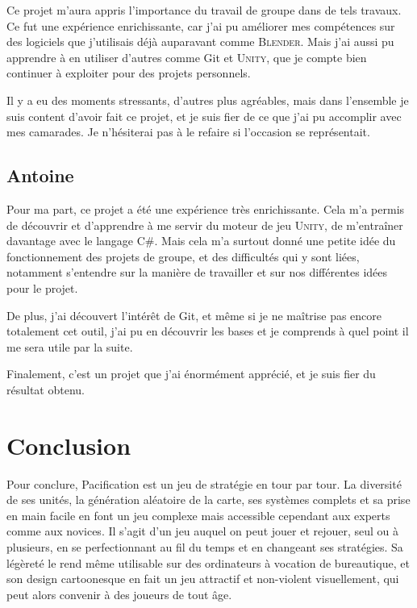 \documentclass[12pt]{report}
\begin{document}
Ce projet m’aura appris l’importance du travail de groupe dans de tels travaux.
Ce fut une expérience enrichissante, car j’ai pu améliorer mes compétences sur
des logiciels que j’utilisais déjà auparavant comme \textsc{Blender}. Mais j’ai
aussi pu apprendre à en utiliser d’autres comme Git et \textsc{Unity}, que je
compte bien continuer à exploiter pour des projets personnels.

Il y a eu des moments stressants, d’autres plus agréables, mais dans l’ensemble
je suis content d’avoir fait ce projet, et je suis fier de ce que j’ai pu
accomplir avec mes camarades. Je n’hésiterai pas à le refaire si l’occasion se
représentait. 

\section{Antoine}

Pour ma part, ce projet a été une expérience très enrichissante. Cela m’a permis
de découvrir et d’apprendre à me servir du moteur de jeu \textsc{Unity}, de
m'entraîner davantage avec le langage C\#. Mais cela m’a surtout donné une
petite idée du fonctionnement des projets de groupe, et des difficultés qui y
sont liées, notamment s’entendre sur la manière de travailler et sur nos
différentes idées pour le projet. 

De plus, j’ai découvert l'intérêt de Git, et même si je ne maîtrise pas encore
totalement cet outil, j’ai pu en découvrir les bases et je comprends à quel point
il me sera utile par la suite. 

Finalement, c’est un projet que j’ai énormément apprécié, et je suis fier du
résultat obtenu.

\chapter{Conclusion}

Pour conclure, Pacification est un jeu de stratégie en tour par tour. La
diversité de ses unités, la génération aléatoire de la carte, ses systèmes
complets et sa prise en main facile en font un jeu complexe mais accessible
cependant aux experts comme aux novices. Il s’agit d’un jeu auquel on peut jouer
et rejouer, seul ou à plusieurs, en se perfectionnant au fil du temps et en
changeant ses stratégies.  Sa légèreté le rend même utilisable sur des
ordinateurs à vocation de bureautique, et son design cartoonesque en fait un jeu
attractif et non-violent visuellement, qui peut alors convenir à des joueurs de
tout âge.
\end{document}
